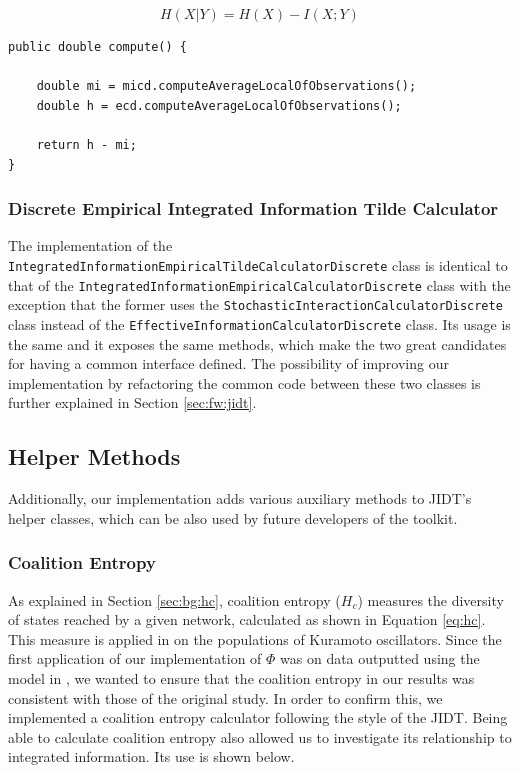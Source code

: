 \documentclass[a4paper,11pt]{article}
\begin{document}
\begin{equation} \label{eq:ce}
H(X|Y) = H(X) - I(X; Y)
\end{equation}

\begin{verbatim}
public double compute() {

	double mi = micd.computeAverageLocalOfObservations();
	double h = ecd.computeAverageLocalOfObservations();

	return h - mi;
}
\end{verbatim}

\subsubsection{Discrete Empirical Integrated Information Tilde Calculator}

The implementation of the \texttt{IntegratedInformationEmpiricalTildeCalculatorDiscrete} class is identical to that of the \texttt{IntegratedInformationEmpiricalCalculatorDiscrete} class with the exception that the former uses the \texttt{StochasticInteractionCalculatorDiscrete} class instead of the \texttt{EffectiveInformationCalculatorDiscrete} class. Its usage is the same and it exposes the same methods, which make the two great candidates for having a common interface defined. The possibility of improving our implementation by refactoring the common code between these two classes is further explained in Section \ref{sec:fw:jidt}.

\subsection{Helper Methods}
Additionally, our implementation adds various auxiliary methods to JIDT's helper classes, which can be also used by future developers of the toolkit.

\subsubsection{Coalition Entropy}
\label{sec:impl:hc}

As explained in Section \ref{sec:bg:hc}, coalition entropy ($H_c$) measures the diversity of states reached by a given network, calculated as shown in Equation \ref{eq:hc}. This measure is applied in \cite{Shanahan2010} on the populations of Kuramoto oscillators. Since the first application of our implementation of $\Phi$ was on data outputted using the model in \cite{Shanahan2010}, we wanted to ensure that the coalition entropy in our results was consistent with those of the original study. In order to confirm this, we implemented a coalition entropy calculator following the style of the JIDT. Being able to calculate coalition entropy also allowed us to investigate its relationship to integrated information. Its use is shown below.
\end{document}
